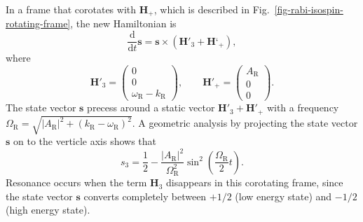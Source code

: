 \documentclass[%
reprint,
 amsmath,amssymb,
 prd,
]{revtex4-1}
\begin{document}
In a frame that corotates with $\mathbf{H}_+$, which is described in Fig.~\ref{fig-rabi-isospin-rotating-frame}, the new Hamiltonian is
\begin{equation}
\frac{\mathrm d}{\mathrm d t } \mathbf{s} = \mathbf{s} \times (\mathbf{H}'_3 + \mathbf{H}‘_+),
\end{equation}
where
\begin{equation}
\mathbf{H}'_3 = \begin{pmatrix}
    0 \\ 0 \\ 　\omega_{\mathrm{R}} - k_{\mathrm R}
    \end{pmatrix}, \qquad \mathbf{H}'_+ = \begin{pmatrix}
    A_{\mathrm{R}} \\ 0 \\ 　0
    \end{pmatrix}.
\end{equation}
The state vector $\mathbf{s}$ precess around a static vector $\mathbf{H}'_3 + \mathbf{H}'_+$ with a frequency $\Omega_{\mathrm R} = \sqrt{ \lvert A_{\mathrm{R}}\rvert^2 + (k_{\mathrm{R}} - \omega_{\mathrm R})^2 }$. A geometric analysis by projecting the state vector $\mathbf{s}$ on to the verticle axis shows that
\begin{equation}
s_3 = \frac{1}{2} - \frac{\lvert A_{\mathrm R}\rvert ^2}{\Omega_{\mathrm R}^2}\sin^2\left(\frac{\Omega_{\mathrm R}}{2} t\right).
\end{equation}
Resonance occurs when the term $\mathbf{H}_3$ disappears in this corotating frame, since the state vector $\mathbf{s}$ converts completely between $+1/2$ (low energy state) and $-1/2$ (high energy state).
\end{document}
